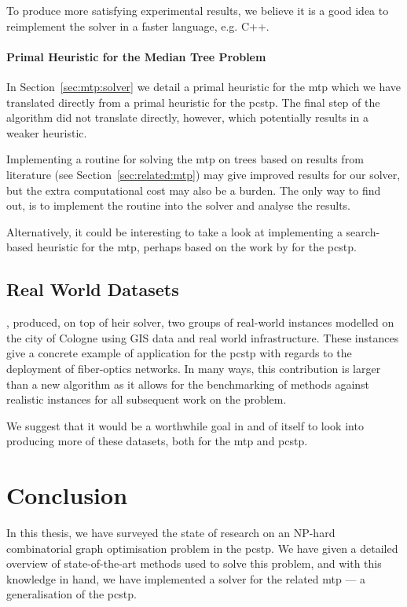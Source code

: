 To produce more satisfying experimental results, we believe it is a good idea to reimplement
the solver in a faster language, e.g. C++.

\paragraph{Primal Heuristic for the Median Tree Problem}
In Section~\ref{sec:mtp:solver} we detail a primal heuristic for the \gls{mtp}
which we have translated directly from a primal heuristic for the \gls{pcstp}.
The final step of the algorithm did not translate directly, however, which potentially
results in a weaker heuristic.

Implementing a routine for solving the \gls{mtp} on trees based on results from literature
(see Section~\ref{sec:related:mtp}) may give improved results for our solver,
but the extra computational cost may also be a burden. The only way to find out, is
to implement the routine into the solver and analyse the results.

Alternatively, it could be interesting to take a look at implementing a search-based
heuristic for the \gls{mtp}, perhaps based on the work by \citet{canuto2001local}
for the \gls{pcstp}.

\subsection{Real World Datasets}
\citet{ljubic2006algorithmic}, produced, on top of heir solver,
two groups of real-world
instances modelled on the city of Cologne using GIS data and real world infrastructure.
These instances give a concrete example of application for the \gls{pcstp} with regards
to the deployment of fiber-optics networks.
In many ways, this contribution is larger than
a new algorithm as it allows for the benchmarking of methods against realistic instances
for all subsequent work on the problem.

We suggest that it would be a worthwhile goal in and of itself to look into
producing more of these
datasets, both for the \gls{mtp} and \gls{pcstp}.

\section{Conclusion}\label{sec:con:con}
In this thesis, we have surveyed the state of research on
an NP-hard combinatorial graph optimisation problem in
the \acrlong{pcstp}. We have given a detailed overview of state-of-the-art
methods used to solve this problem, and
with this knowledge in hand, we have implemented a solver for the related
\acrlong{mtp} --- a generalisation of the \gls{pcstp}.
\medskip

